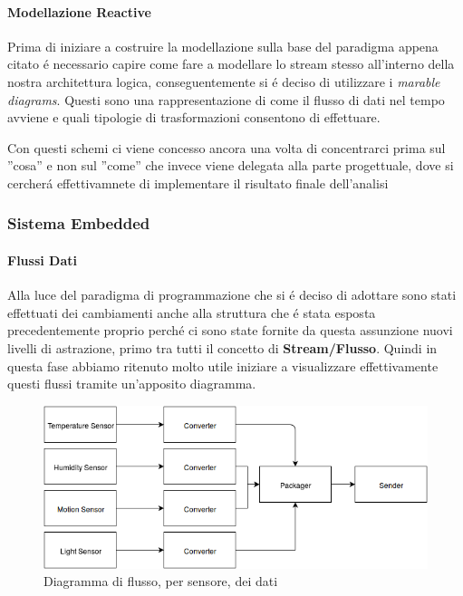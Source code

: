 \paragraph{Modellazione Reactive}

Prima di iniziare a costruire la modellazione sulla base del paradigma appena citato \'e necessario capire come fare a modellare lo stream stesso all'interno della nostra architettura logica, conseguentemente si \'e deciso di utilizzare i \textit{marable diagrams}. Questi sono una rappresentazione di come il flusso di dati nel tempo avviene e quali tipologie di trasformazioni consentono di effettuare.

Con questi schemi ci viene concesso ancora una volta di concentrarci prima sul ''cosa'' e non sul ''come'' che invece viene delegata alla parte progettuale, dove si cercher\'a effettivamnete di implementare il risultato finale dell'analisi

\subsubsection{Sistema Embedded}

\paragraph{Flussi Dati} Alla luce del paradigma di programmazione che si \'e deciso di adottare sono stati effettuati dei cambiamenti anche alla struttura che \'e stata esposta precedentemente proprio perch\'e ci sono state fornite da questa assunzione nuovi livelli di astrazione, primo tra tutti il concetto di \textbf{Stream/Flusso}. Quindi in questa fase abbiamo ritenuto molto utile iniziare a visualizzare effettivamente questi flussi tramite un'apposito diagramma.

\begin{figure}[ht]
\centering
\includegraphics[width=\textwidth]{Figures/LogicArchitecture/EmbeddedSystem/FlowDiagram}
\caption{Diagramma di flusso, per sensore, dei dati}
\end{figure}


